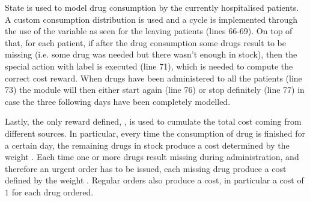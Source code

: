 {      State  is used to model drug consumption by the currently hospitalised patients. A custom consumption distribution is used and a cycle is implemented through the use of the  variable as seen for the leaving patients (lines 66-69). On top of that, for each patient, if after the drug consumption some drugs result to be missing (i.e. some drug was needed but there wasn't enough in stock), then the special action with label  is executed (line 71), which is needed to compute the correct cost reward. When drugs have been administered to all the patients (line 73) the module will then either start again (line 76) or stop definitely (line 77) in case the three following days have been completely modelled.
      
      Lastly, the only reward defined, , is used to cumulate the total cost coming from different sources. In particular, every time the consumption of drug is finished for a certain day, the remaining drugs in stock produce a cost determined by the weight . Each time one or more drugs result missing during administration, and therefore an urgent order has to be issued, each missing drug produce a cost defined by the weight . Regular orders also produce a cost, in particular a cost of $1$ for each drug ordered.
    }
